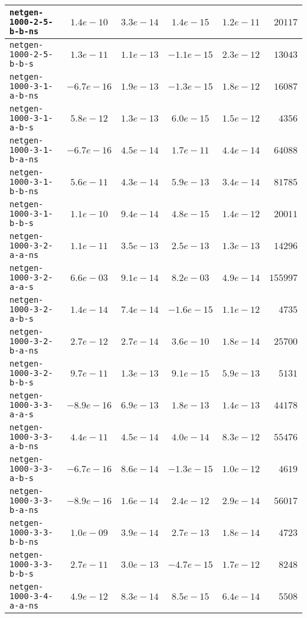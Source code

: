 \begin{center}
\begin{longtable}{|l || c | c | c | c | r|}
\hline
\texttt{netgen-1000-2-5-b-b-ns} & $1.4e-10$ & $3.3e-14$ & $1.4e-15$ & $1.2e-11$ & $20117$ \\
\hline
\texttt{netgen-1000-2-5-b-b-s} & $1.3e-11$ & $1.1e-13$ & $-1.1e-15$ & $2.3e-12$ & $13043$ \\
\hline
\texttt{netgen-1000-3-1-a-b-ns} & $-6.7e-16$ & $1.9e-13$ & $-1.3e-15$ & $1.8e-12$ & $16087$ \\
\hline
\texttt{netgen-1000-3-1-a-b-s} & $5.8e-12$ & $1.3e-13$ & $6.0e-15$ & $1.5e-12$ & $4356$ \\
\hline
\texttt{netgen-1000-3-1-b-a-ns} & $-6.7e-16$ & $4.5e-14$ & $1.7e-11$ & $4.4e-14$ & $64088$ \\
\hline
\texttt{netgen-1000-3-1-b-b-ns} & $5.6e-11$ & $4.3e-14$ & $5.9e-13$ & $3.4e-14$ & $81785$ \\
\hline
\texttt{netgen-1000-3-1-b-b-s} & $1.1e-10$ & $9.4e-14$ & $4.8e-15$ & $1.4e-12$ & $20011$ \\
\hline
\texttt{netgen-1000-3-2-a-a-ns} & $1.1e-11$ & $3.5e-13$ & $2.5e-13$ & $1.3e-13$ & $14296$ \\
\hline
\texttt{netgen-1000-3-2-a-a-s} & $6.6e-03$ & $9.1e-14$ & $8.2e-03$ & $4.9e-14$ & $155997$ \\
\hline
\texttt{netgen-1000-3-2-a-b-s} & $1.4e-14$ & $7.4e-14$ & $-1.6e-15$ & $1.1e-12$ & $4735$ \\
\hline
\texttt{netgen-1000-3-2-b-a-ns} & $2.7e-12$ & $2.7e-14$ & $3.6e-10$ & $1.8e-14$ & $25700$ \\
\hline
\texttt{netgen-1000-3-2-b-b-s} & $9.7e-11$ & $1.3e-13$ & $9.1e-15$ & $5.9e-13$ & $5131$ \\
\hline
\texttt{netgen-1000-3-3-a-a-s} & $-8.9e-16$ & $6.9e-13$ & $1.8e-13$ & $1.4e-13$ & $44178$ \\
\hline
\texttt{netgen-1000-3-3-a-b-ns} & $4.4e-11$ & $4.5e-14$ & $4.0e-14$ & $8.3e-12$ & $55476$ \\
\hline
\texttt{netgen-1000-3-3-a-b-s} & $-6.7e-16$ & $8.6e-14$ & $-1.3e-15$ & $1.0e-12$ & $4619$ \\
\hline
\texttt{netgen-1000-3-3-b-a-ns} & $-8.9e-16$ & $1.6e-14$ & $2.4e-12$ & $2.9e-14$ & $56017$ \\
\hline
\texttt{netgen-1000-3-3-b-b-ns} & $1.0e-09$ & $3.9e-14$ & $2.7e-13$ & $1.8e-14$ & $4723$ \\
\hline
\texttt{netgen-1000-3-3-b-b-s} & $2.7e-11$ & $3.0e-13$ & $-4.7e-15$ & $1.7e-12$ & $8248$ \\
\hline
\texttt{netgen-1000-3-4-a-a-ns} & $4.9e-12$ & $8.3e-14$ & $8.5e-15$ & $6.4e-14$ & $5508$ \\

\end{longtable}
\end{center}
